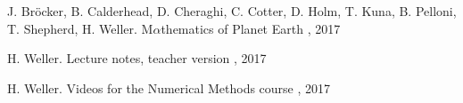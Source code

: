 %
\begin{thebibliography}{99}

J. Br\"{o}cker, B. Calderhead, D. Cheraghi, C. Cotter, D. Holm, T. Kuna, B. Pelloni, T. Shepherd, H. Weller.
\newblock M$\alpha$thematics of Planet Earth
, 2017

H. Weller.
\newblock Lecture notes, teacher version
\newblock {\em }, 2017


H. Weller.
\newblock Videos for the Numerical Methods course
, 2017

\end{thebibliography}
